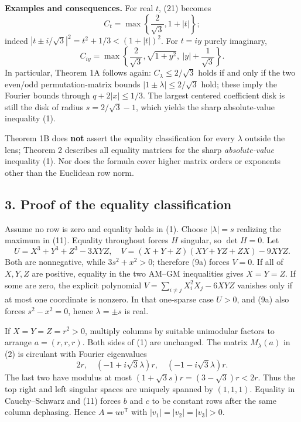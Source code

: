 \documentclass[
  11pt,
]{article}
\begin{document}
\textbf{Examples and consequences.} For real \(t\), (21) becomes \[
C_t=\max\left\{\frac2{\sqrt3},1+|t|\right\};
\tag{28}
\] indeed \(|t\pm i/\sqrt3|^2=t^2+1/3<
(1+|t|)^2\). For \(t=iy\) purely imaginary, \[
C_{iy}=\max\left\{\frac2{\sqrt3},
\sqrt{1+y^2},\ |y|+\frac1{\sqrt3}\right\}.
\tag{29}
\] In particular, Theorem 1A follows again: \(C_\lambda\le2/\sqrt3\)
holds if and only if the two even/odd permutation-matrix bounds
\(|1\pm\lambda|\le2/\sqrt3\) hold; these imply the Fourier bounds
through \(q+2|x|\le1/3\). The largest centered coefficient disk is still
the disk of radius \(s=2/\sqrt3-1\), which yields the sharp
absolute-value inequality (1).

Theorem 1B does \textbf{not} assert the equality classification for
every \(\lambda\) outside the lens; Theorem 2 describes all equality
matrices for the sharp \emph{absolute-value} inequality (1). Nor does
the formula cover higher matrix orders or exponents other than the
Euclidean row norm.

\subsection{3. Proof of the equality
classification}\label{proof-of-the-equality-classification}

Assume no row is zero and equality holds in (1). Choose \(|\lambda|=s\)
realizing the maximum in (11). Equality throughout forces \(H\)
singular, so \(\det H=0\). Let \[
U=X^3+Y^3+Z^3-3XYZ,\quad
V=(X+Y+Z)(XY+YZ+ZX)-9XYZ.
\] Both are nonnegative, while \(3s^2+x^2>0\); therefore (9a) forces
\(V=0\). If all of \(X,Y,Z\) are positive, equality in the two AM--GM
inequalities gives \(X=Y=Z\). If some are zero, the explicit polynomial
\(V=\sum_{i\ne j}X_i^2X_j-6XYZ\) vanishes only if at most one coordinate
is nonzero. In that one-sparse case \(U>0\), and (9a) also forces
\(s^2-x^2=0\), hence \(\lambda=\pm s\) is real.

If \(X=Y=Z=r^2>0\), multiply columns by suitable unimodular factors to
arrange \(a=(r,r,r)\). Both sides of (1) are unchanged. The matrix
\(M_\lambda(a)\) in (2) is circulant with Fourier eigenvalues \[
2r,\quad(-1+i\sqrt3\lambda)r,\quad(-1-i\sqrt3\lambda)r.
\] The last two have modulus at most \((1+\sqrt3s)r=(3-\sqrt3)r<2r\).
Thus the top right and left singular spaces are uniquely spanned by
\((1,1,1)\). Equality in Cauchy--Schwarz and (11) forces \(b\) and \(c\)
to be constant rows after the same column dephasing. Hence
\(A=uv^{\mathsf T}\) with \(|v_1|=|v_2|=|v_3|>0\).
\end{document}
